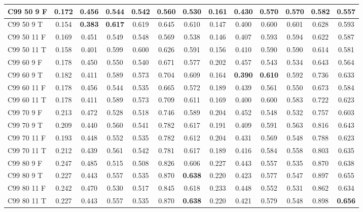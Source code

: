 \documentclass{article}
\begin{document}
\begin{tabular}{|l|c|c|c|c|c|c|c|c|c|c|c|c|}
C99 50  9 F & 0.172 & 0.456 & 0.544 & 0.542 & 0.560 & 0.530 & 0.161 & 0.430 & 0.570 & 0.570 & 0.582 & 0.557\\ \hline
C99 50  9 T & 0.154 & \textbf{0.383} & \textbf{0.617} & 0.619 & 0.645 & 0.610 & 0.147 & 0.400 & 0.600 & 0.601 & 0.628 & 0.593\\ \hline
C99 50 11 F & 0.169 & 0.451 & 0.549 & 0.548 & 0.569 & 0.538 & 0.146 & 0.407 & 0.593 & 0.594 & 0.622 & 0.587\\ \hline
C99 50 11 T & 0.158 & 0.401 & 0.599 & 0.600 & 0.626 & 0.591 & 0.156 & 0.410 & 0.590 & 0.590 & 0.614 & 0.581\\ \hline
C99 60  9 F & 0.178 & 0.450 & 0.550 & 0.540 & 0.671 & 0.577 & 0.202 & 0.457 & 0.543 & 0.534 & 0.643 & 0.564\\ \hline
C99 60  9 T & 0.182 & 0.411 & 0.589 & 0.573 & 0.704 & 0.609 & 0.164 & \textbf{0.390} & \textbf{0.610} & 0.592 & 0.736 & 0.633\\ \hline
C99 60 11 F & 0.178 & 0.456 & 0.544 & 0.535 & 0.665 & 0.572 & 0.189 & 0.439 & 0.561 & 0.550 & 0.673 & 0.584\\ \hline
C99 60 11 T & 0.178 & 0.411 & 0.589 & 0.573 & 0.709 & 0.611 & 0.169 & 0.400 & 0.600 & 0.583 & 0.722 & 0.623\\ \hline
C99 70  9 F & 0.213 & 0.472 & 0.528 & 0.518 & 0.746 & 0.589 & 0.204 & 0.452 & 0.548 & 0.532 & 0.757 & 0.603\\ \hline
C99 70  9 T & 0.209 & 0.440 & 0.560 & 0.541 & 0.782 & 0.617 & 0.191 & 0.409 & 0.591 & 0.563 & 0.816 & 0.643\\ \hline
C99 70 11 F & 0.193 & 0.448 & 0.552 & 0.535 & 0.782 & 0.612 & 0.204 & 0.431 & 0.569 & 0.548 & 0.788 & 0.623\\ \hline
C99 70 11 T & 0.212 & 0.439 & 0.561 & 0.542 & 0.781 & 0.617 & 0.189 & 0.416 & 0.584 & 0.558 & 0.803 & 0.635\\ \hline
C99 80  9 F & 0.247 & 0.485 & 0.515 & 0.508 & 0.826 & 0.606 & 0.227 & 0.443 & 0.557 & 0.535 & 0.870 & 0.638\\ \hline
C99 80  9 T & 0.227 & 0.443 & 0.557 & 0.535 & 0.870 & \textbf{0.638} & 0.220 & 0.423 & 0.577 & 0.547 & 0.897 & 0.655\\ \hline
C99 80 11 F & 0.242 & 0.470 & 0.530 & 0.517 & 0.845 & 0.618 & 0.233 & 0.448 & 0.552 & 0.531 & 0.862 & 0.634\\ \hline
C99 80 11 T & 0.227 & 0.443 & 0.557 & 0.535 & 0.870 & \textbf{0.638} & 0.220 & 0.421 & 0.579 & 0.548 & 0.898 & \textbf{0.656}\\ \hline
\end{tabular} 
\end{document}
